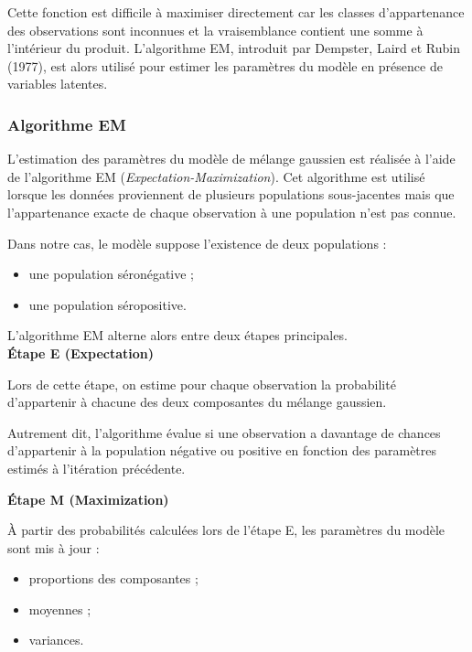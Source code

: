 \documentclass[a4paper]{article}
\begin{document}
Cette fonction est difficile à maximiser directement car les classes d'appartenance des observations sont inconnues et la vraisemblance contient une somme à l'intérieur du produit. L'algorithme EM, introduit par Dempster, Laird et Rubin (1977), est alors utilisé pour estimer les paramètres du modèle en présence de variables latentes.

\subsubsection{Algorithme EM}

L’estimation des paramètres du modèle de mélange gaussien est réalisée à l’aide de l’algorithme EM (\textit{Expectation-Maximization}). Cet algorithme est utilisé lorsque les données proviennent de plusieurs populations sous-jacentes mais que l’appartenance exacte de chaque observation à une population n’est pas connue.

Dans notre cas, le modèle suppose l’existence de deux populations :
\begin{itemize}
    \item une population séronégative ;
    \item une population séropositive.
\end{itemize}

L’algorithme EM alterne alors entre deux étapes principales. \\

\textbf{Étape E (Expectation)}

Lors de cette étape, on estime pour chaque observation la probabilité d’appartenir à chacune des deux composantes du mélange gaussien.

Autrement dit, l’algorithme évalue si une observation a davantage de chances d’appartenir à la population négative ou positive en fonction des paramètres estimés à l’itération précédente.


\textbf{Étape M (Maximization)}

À partir des probabilités calculées lors de l’étape E, les paramètres du modèle sont mis à jour :
\begin{itemize}
    \item proportions des composantes ;
    \item moyennes ;
    \item variances.
\end{itemize}
\end{document}
